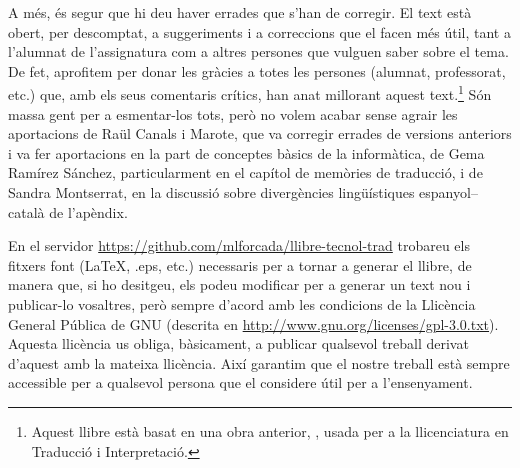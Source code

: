   A més, és segur que hi deu haver errades que s'han de corregir. El
  text està obert, per descomptat, a suggeriments i a correccions que
  el facen més útil, tant a l'alumnat de l'assignatura com a altres
  persones que vulguen saber sobre el tema.  De fet, aprofitem per
  donar les gràcies a totes les persones (alumnat, professorat, etc.)
  que, amb els seus comentaris crítics, han anat millorant aquest
  text.\footnote{Aquest llibre està basat en una obra anterior,
    \protect\citep{forcada09b}, usada per a la llicenciatura en
    Traducció i Interpretació.}  Són massa gent per a esmentar-los
  tots, però no volem acabar sense agrair les aportacions de Raül
  Canals i Marote, que va corregir errades de versions anteriors i va
  fer aportacions en la part de conceptes bàsics de la informàtica, de
  Gema Ramírez Sánchez, particularment en el capítol de memòries de
  traducció, i de Sandra Montserrat, en la discussió sobre
  divergències lingüístiques espanyol--català de l'apèndix.

  En el servidor \url{https://github.com/mlforcada/llibre-tecnol-trad}
  trobareu els fitxers font (\LaTeX, .eps, etc.) necessaris per a
  tornar a generar el llibre, de manera que, si ho desitgeu, els podeu
  modificar per a generar un text nou i publicar-lo vosaltres, però
  sempre d'acord amb les condicions de la Llicència General Pública de
  GNU (descrita en
  \url{http://www.gnu.org/licenses/gpl-3.0.txt}). Aquesta llicència us
  obliga, bàsicament, a publicar qualsevol treball derivat d'aquest
  amb la mateixa llicència. Així garantim que el nostre treball està
  sempre accessible per a qualsevol persona que el considere útil per
  a l'ensenyament.

